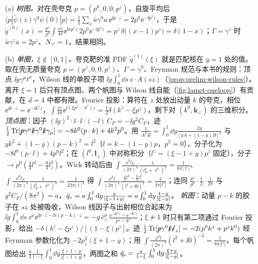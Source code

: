 \begin{example}\label{ex:lattice-quasi-tree}
(a) \emph{树图。}对在壳夸克 $p=(p^0,0,0,p^z)$，自旋平均后 $\langle p|\bar\psi(z)\gamma^0\psi(0)|p\rangle=\frac12\sum_s\bar u\gamma^0u\,\ee^{\ii p\cdot z}=2p^0\ee^{-\ii p^zz}$，于是 $\tilde q^{(0)}(x)=\frac{p^z}{p^0}\int\frac{\dd z}{4\pi}\ee^{\ii xp^zz}\,2p^0\ee^{-\ii p^zz}=p^z\,\delta\big((x-1)p^z\big)=\delta(1-x)$；$\Gamma=\gamma^z$ 时 $\bar u\gamma^zu=2p^z$、$N_{\gamma^z}=1$，结果相同。

(b) \emph{单圈，$\xi\notin[0,1]$。}夸克靶的准 PDF $\tilde q^{(1)}(\xi)$ 就是匹配核在 $y=1$ 处的值。取在壳无质量夸克 $p=(p^z,0,0,p^z)$、$\Gamma=\gamma^0$、Feynman 规范与本书的规则：顶点 $\ii g\gamma^\mu t^a$，Wilson 线的单胶子项 $\ii g\int_0^1\dd s\,z\cdot A(sz)$（\cref{prop:prelim-wilson-rules}）。离开 $\xi=1$ 后只有顶点图、两个帆图与 Wilson 线自能（\cref{fig:lamet-oneloop}）有贡献，在 $d=4$ 中都有限。Fourier 投影：算符在 $z$ 处放出动量 $k$ 的夸克，相位 $\ee^{\ii k\cdot z}=\ee^{-\ii k^zz}$，$\int\frac{\dd z}{4\pi}\ee^{\ii(\xi p^z-k^z)z}=\frac12\delta(k^z-\xi p^z)$，剩下对 $(k^0,\mathbf k_\perp)$ 的三维积分。
\emph{顶点图}：因子 $(\ii g)^2\cdot\ii\cdot\ii\cdot(-\ii)\,C_F=-\ii g^2C_F$，迹 $\frac12\operatorname{Tr}[\slashed{p}\gamma^\mu\slashed{k}\gamma^0\slashed{k}\gamma_\mu]=-8k^0(p\cdot k)+4k^2p^0$。用 $\frac1{A^2B}=\int_0^1\dd y\frac{2y}{[yA+(1-y)B]^3}$ 与 $yk^2+(1-y)(p-k)^2=l^2$（$l=k-(1-y)p$，$p^2=0$），分子化为 $-8l^0(p\cdot l)+4p^0l^2$；在 $(l^0,\mathbf l_\perp)$ 中对称积分（$l^z=(\xi-1+y)p^z$ 固定），分子 $\to p^0(\frac43l^2-\frac83l_z^2)$。Wick 转动后由 $\int\frac{\dd^3l_E}{(2\pi)^3}\frac1{(l_E^2+\ell^2)^2}=\frac1{8\pi|\ell|}$、$\int\frac{\dd^3l_E}{(2\pi)^3}\frac1{(l_E^2+\ell^2)^3}=\frac1{32\pi|\ell|^3}$ 得 $\int\frac{\dd^3l}{(2\pi)^3}\frac{\frac43l^2-\frac83l_z^2}{(l^2+\ii0)^3}=\frac{\ii}{4\pi|l^z|}$；连同 $\frac{p^z}{p^0}\cdot\frac12\cdot\frac1{2\pi}$ 与 $g^2C_F/(8\pi^2)=a$，$\tilde q_{\rm v}=a\int_0^1\mathrm{d} y\frac{y}{|\xi-1+y|}=a\int_0^1\mathrm{d} y\frac{1-y}{|\xi-y|}$。
\emph{帆图}：动量 $p-k$ 的胶子在 $sz$ 处被吸收，Wilson 线因子与出射相位合起来为 $\ii g\int_0^1\dd s\,z^\mu\ee^{\ii p\cdot z-\ii s(p-k)\cdot z}=-g\,\hat e_z^\mu\,\frac{\ee^{-\ii p^zz}-\ee^{-\ii k^zz}}{p^z-k^z}$；$\xi\neq1$ 时只有第二项通过 Fourier 投影，给出 $-\delta(k^z-\xi p^z)/[(1-\xi)p^z]$。迹 $\frac12\operatorname{Tr}[\slashed{p}\gamma^0\slashed{k}\slashed{\hat e}_z]=-2(p^0k^z+p^zk^0)$ 经 Feynman 参数化化为 $-2p_z^2(\xi+1-y)$；用 $\int\frac{\dd^3l}{(2\pi)^3}(l^2+\ii0)^{-2}=\frac{\ii}{8\pi|l^z|}$，每个帆图给出 $\frac a2\frac1{1-\xi}\int_0^1\dd y\frac{\xi+1-y}{|\xi-1+y|}$，两图之和 $\tilde q_{\rm s}=\frac a{1-\xi}\int_0^1\mathrm{d} y\frac{\xi+y}{|\xi-y|}$。

\end{example}
